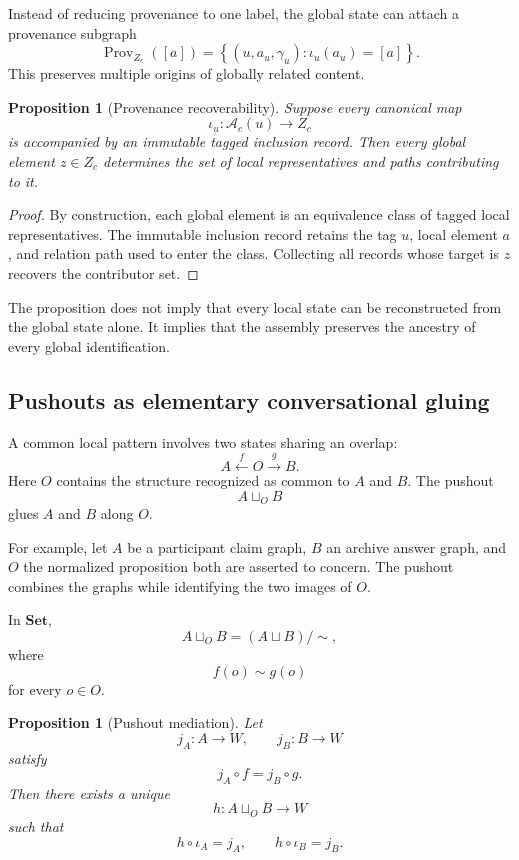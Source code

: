 \documentclass[11pt]{article}
\newtheorem{proposition}[definition]{Proposition}
\theoremstyle{definition}
\newcommand{\A}{\mathcal{A}}
\begin{document}
Instead of reducing provenance to one label, the global state can attach a provenance subgraph
\[
\operatorname{Prov}_{Z_c}([a])
=
\left\{
(u,a_u,\gamma_u):
\iota_u(a_u)=[a]
\right\}.
\]
This preserves multiple origins of globally related content.

\begin{proposition}[Provenance recoverability]
Suppose every canonical map
\[
\iota_u:\A_c(u)\to Z_c
\]
is accompanied by an immutable tagged inclusion record. Then every global element \(z\in Z_c\) determines the set of local representatives and paths contributing to it.
\end{proposition}

\begin{proof}
By construction, each global element is an equivalence class of tagged local representatives. The immutable inclusion record retains the tag \(u\), local element \(a\), and relation path used to enter the class. Collecting all records whose target is \(z\) recovers the contributor set.
\end{proof}

The proposition does not imply that every local state can be reconstructed from the global state alone. It implies that the assembly preserves the ancestry of every global identification.

\subsection{Pushouts as elementary conversational gluing}

A common local pattern involves two states sharing an overlap:
\[
A
\xleftarrow{f}
O
\xrightarrow{g}
B.
\]
Here \(O\) contains the structure recognized as common to \(A\) and \(B\). The pushout
\[
A\sqcup_O B
\]
glues \(A\) and \(B\) along \(O\).

For example, let \(A\) be a participant claim graph, \(B\) an archive answer graph, and \(O\) the normalized proposition both are asserted to concern. The pushout combines the graphs while identifying the two images of \(O\).

In \(\mathbf{Set}\),
\[
A\sqcup_O B
=
(A\sqcup B)/{\sim},
\]
where
\[
f(o)\sim g(o)
\]
for every \(o\in O\).

\begin{proposition}[Pushout mediation]
Let
\[
j_A:A\to W,
\qquad
j_B:B\to W
\]
satisfy
\[
j_A\circ f
=
j_B\circ g.
\]
Then there exists a unique
\[
h:A\sqcup_O B\to W
\]
such that
\[
h\circ\iota_A=j_A,
\qquad
h\circ\iota_B=j_B.
\]
\end{proposition}
\end{document}

